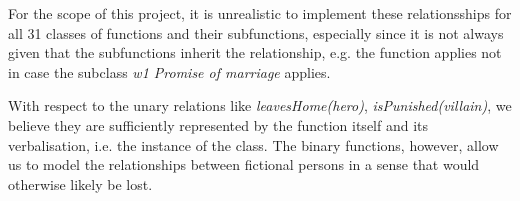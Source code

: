 \documentclass[10pt,a4paper]{article}
\begin{document}
For the scope of this project, it is unrealistic to implement these relationsships for all 31 classes of functions and their subfunctions, especially since it is not always given that the subfunctions inherit the relationship, e.g. the  function applies not in case the subclass \textit{w1 Promise of marriage} applies. 

With respect to the unary relations like \textit{leavesHome(hero)}, \textit{isPunished(villain)}, we believe they are sufficiently represented by the function itself and its verbalisation, i.e. the instance of the class. The binary functions, however, allow us to model the relationships between fictional persons in a sense that would otherwise likely be lost.  



\normalsize
\newpage
\end{document}
